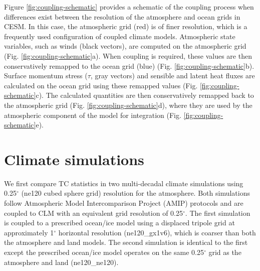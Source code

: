 \documentclass[draft,ms]{AGUTeX}
\newcommand{\degree}{$^{\circ}$}
\begin{document}
\begin{article}
Figure \ref{fig:coupling-schematic} provides a schematic of the coupling process when differences exist between the resolution of the atmosphere and ocean grids in CESM. In this case, the atmospheric grid (red) is of finer resolution, which is a frequently used configuration of coupled climate models. Atmospheric state variables, such as winds (black vectors), are computed on the atmospheric grid (Fig. \ref{fig:coupling-schematic}a). When coupling is required, these values are then conservatively remapped to the ocean grid (blue) (Fig. \ref{fig:coupling-schematic}b). Surface momentum stress ($\tau$, gray vectors) and sensible and latent heat fluxes are calculated on the ocean grid using these remapped values (Fig. \ref{fig:coupling-schematic}c). The calculated quantities are then conservatively remapped back to the atmospheric grid (Fig. \ref{fig:coupling-schematic}d), where they are used by the atmospheric component of the model for integration (Fig. \ref{fig:coupling-schematic}e).

\section{Climate simulations}
\label{sec:climate}

We first compare TC statistics in two multi-decadal climate simulations using 0.25\degree{} (ne120 cubed sphere grid) resolution for the atmosphere. Both simulations follow Atmospheric Model Intercomparison Project (AMIP) protocols \citep{Gates1992} and are coupled to CLM with an equivalent grid resolution of 0.25\degree{}. The first simulation is coupled to a prescribed ocean/ice model using a displaced tripole grid at approximately 1\degree{} horizontal resolution (ne120\_gx1v6), which is coarser than both the atmosphere and land models. The second simulation is identical to the first except the prescribed ocean/ice model operates on the same 0.25\degree{} grid as the atmosphere and land (ne120\_ne120).


\end{article}
\end{document}
